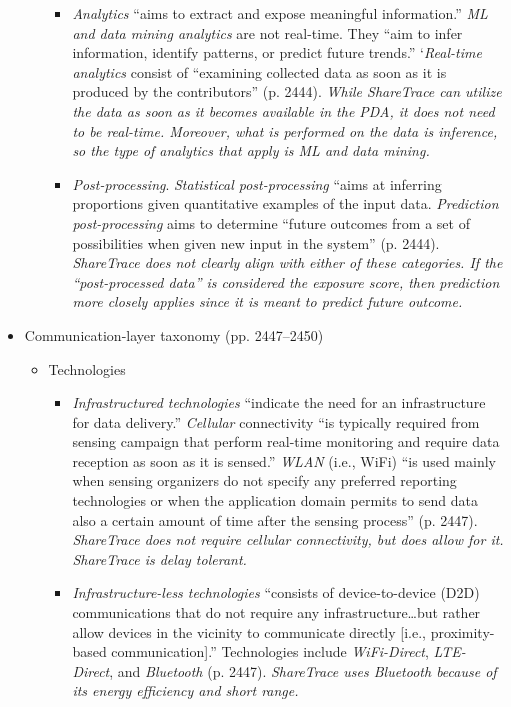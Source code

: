 \begin{itemize}
\begin{itemize}
\begin{itemize}
			\item \emph{Analytics} ``aims to extract and expose meaningful information.'' \emph{ML and data mining analytics} are not real-time. They ``aim to infer information, identify patterns, or predict future trends.'' `\emph{Real-time analytics} consist of ``examining collected data as soon as it is produced by the contributors'' (p. 2444). \emph{While ShareTrace can utilize the data as soon as it becomes available in the PDA, it does not need to be real-time. Moreover, what is performed on the data is inference, so the type of analytics that apply is ML and data mining.}
			\item \emph{Post-processing}. \emph{Statistical post-processing} ``aims at inferring proportions given quantitative examples of the input data. \emph{Prediction post-processing} aims to determine ``future outcomes from a set of possibilities when given new input in the system'' (p. 2444). \emph{ShareTrace does not clearly align with either of these categories. If the ``post-processed data'' is considered the exposure score, then prediction more closely applies since it is meant to predict future outcome.}
			\end{itemize}
		\end{itemize}
	\item Communication-layer taxonomy (pp. 2447--2450)
		\begin{itemize}
		\item Technologies
			\begin{itemize}
			\item \emph{Infrastructured technologies} ``indicate the need for an infrastructure for data delivery.'' \emph{Cellular} connectivity ``is typically required from sensing campaign that perform real-time monitoring and require data reception as soon as it is sensed.'' \emph{WLAN} (i.e., WiFi) ``is used mainly when sensing organizers do not specify any preferred reporting technologies or when the application domain permits to send data also a certain amount of time after the sensing process'' (p. 2447). \emph{ShareTrace does not require cellular connectivity, but does allow for it. ShareTrace is delay tolerant.}
			\item \emph{Infrastructure-less technologies} ``consists of device-to-device (D2D) communications that do not require any infrastructure{\ldots}but rather allow devices in the vicinity to communicate directly [i.e., proximity-based communication].'' Technologies include \emph{WiFi-Direct}, \emph{LTE-Direct}, and \emph{Bluetooth} (p. 2447). \emph{ShareTrace uses Bluetooth because of its energy efficiency and short range.}

\end{itemize}
\end{itemize}
\end{itemize}

